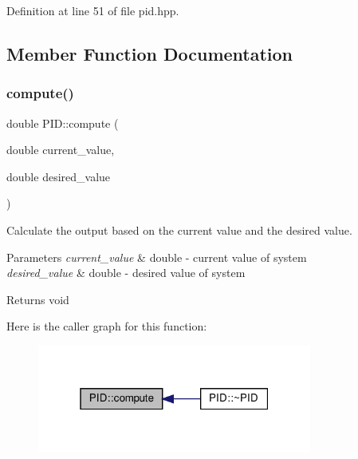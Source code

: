 Definition at line 51 of file pid.\+hpp.



\subsection{Member Function Documentation}
\mbox{\label{classPID_acb5ef99f0f57357393fd3556a413afe9}} 
\subsubsection{\texorpdfstring{compute()}{compute()}}
{\footnotesize\ttfamily double P\+I\+D\+::compute (\begin{DoxyParamCaption}\item[{double}]{current\+\_\+value,  }\item[{double}]{desired\+\_\+value }\end{DoxyParamCaption})}



Calculate the output based on the current value and the desired value. 


\begin{DoxyParams}{Parameters}
{\em current\+\_\+value} & double -\/ current value of system \\
\hline
{\em desired\+\_\+value} & double -\/ desired value of system \\
\hline
\end{DoxyParams}
\begin{DoxyReturn}{Returns}
void 
\end{DoxyReturn}
Here is the caller graph for this function\+:
\nopagebreak
\begin{figure}[H]
\begin{center}
\leavevmode
\includegraphics[width=256pt]{classPID_acb5ef99f0f57357393fd3556a413afe9_icgraph}
\end{center}
\end{figure}
\mbox{\label{classPID_af8c9c5d64221b59cd56ac2543a33eb48}} 
